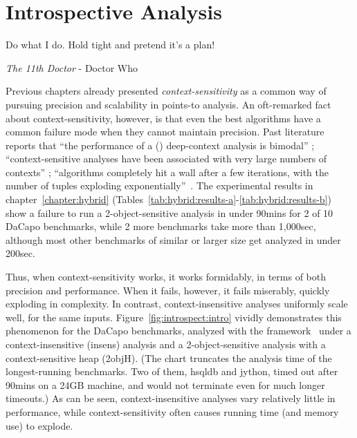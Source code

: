 \chapter{Introspective Analysis}
\label{chapter:introspective}
\epigraph{Do what I do. Hold tight and pretend it’s a plan!}{\textit{The 11th Doctor} - Doctor Who}

Previous chapters already presented \emph{context-sensitivity} as a common way of pursuing precision and scalability in points-to analysis. An oft-remarked fact about context-sensitivity, however, is that even the best algorithms have a common failure mode when they cannot maintain precision. Past literature reports that ``the performance of a (\todo{}) deep-context analysis is bimodal'' \cite{popl:2011:Smaragdakis}; ``context-sensitive analyses have been associated with very large numbers of contexts'' \cite{cc:2006:Lhotak}; ``algorithms completely hit a wall after a few iterations, with the number of tuples exploding exponentially''~\cite{pldi:2011:Liang}. The experimental results in chapter~\ref{chapter:hybrid} (Tables~\ref{tab:hybrid:results-a}-\ref{tab:hybrid:results-b}) show a failure to run a 2-object-sensitive analysis in under 90mins for 2 of 10 DaCapo benchmarks, while 2 more benchmarks take more than 1,000sec, although most other benchmarks of similar or larger size get analyzed in under 200sec.

Thus, when context-sensitivity works, it works formidably, in terms of both precision and performance. When it fails, however, it fails miserably, quickly exploding in complexity. In contrast, context-insensitive analyses uniformly scale well, for the same inputs. Figure~\ref{fig:introspect:intro} vividly demonstrates this phenomenon for the DaCapo benchmarks, analyzed with the \doop{} framework~\cite{oopsla:2009:Bravenboer} under a context-insensitive (insens) analysis and a 2-object-sensitive analysis with a context-sensitive heap (2objH). (The chart truncates the analysis time of the longest-running benchmarks. Two of them, hsqldb and jython, timed out after 90mins on a 24GB machine, and would not terminate even for much longer timeouts.) As can be seen, context-insensitive analyses vary relatively little in performance, while context-sensitivity often causes running time (and memory use) to explode.


